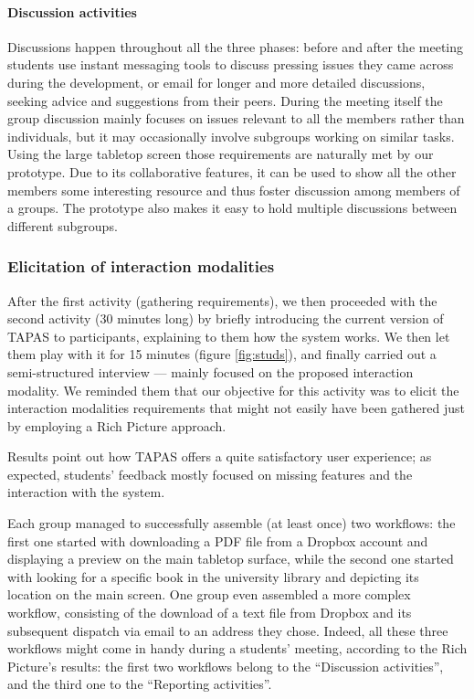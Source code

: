 \paragraph{Discussion activities} Discussions happen throughout all the three phases: before and after the meeting students use instant messaging tools to discuss pressing issues they came across during the development, or email for longer and more detailed discussions, seeking advice and suggestions from their peers. During the meeting itself the group discussion mainly focuses on issues relevant to all the members rather than individuals, but it may occasionally involve subgroups working on similar tasks. Using the large tabletop screen those requirements are naturally met by our prototype. Due to its collaborative features, it can be used to show all the other members some interesting resource and thus foster discussion among members of a groups. The prototype also makes it easy to hold multiple discussions between different subgroups.

\subsubsection{Elicitation of interaction modalities}
After the first activity (gathering requirements), we then proceeded with the second activity (30 minutes long) by briefly introducing the current version of \acs{TAPAS} to participants, explaining to them how the system works. We then let them play with it for 15 minutes (figure \ref{fig:studs}), and finally carried out a semi-structured interview --- mainly focused on the proposed interaction modality. We reminded them that our objective for this activity was to elicit the interaction modalities requirements that might not easily have been gathered just by employing a Rich Picture approach.

Results point out how \acs{TAPAS} offers a quite satisfactory user experience; as expected, students' feedback mostly focused on missing features and the interaction with the system.

Each group managed to successfully assemble (at least once) two workflows: the first one started with downloading a PDF file from a Dropbox account and displaying a preview on the main tabletop surface, while the second one started with looking for a specific book in the university library and depicting its location on the main screen. One group even assembled a more complex workflow, consisting of the download of a text file from Dropbox and its subsequent dispatch via email to an address they chose. Indeed, all these three workflows might come in handy during a students' meeting, according to the Rich Picture's results: the first two workflows belong to the ``Discussion activities'', and the third one to the ``Reporting activities''.

